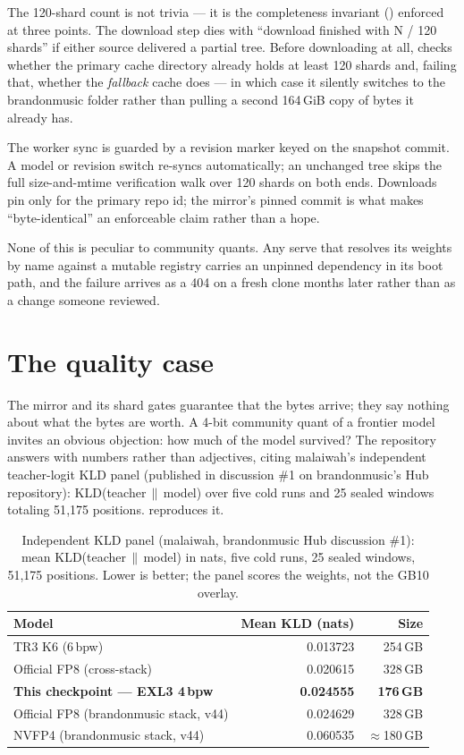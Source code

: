 The 120-shard count is not trivia --- it is the completeness invariant
() enforced at three points. The download step
dies with ``download finished with N / 120 shards'' if either source
delivered a partial tree. Before downloading at all,
 checks whether the primary cache directory
already holds at least 120 shards and, failing that, whether the
\emph{fallback} cache does --- in which case it silently switches
 to the brandonmusic folder rather than pulling a second
164\,GiB copy of bytes it already has.

The worker sync is guarded by a revision marker keyed on the snapshot
commit. A model or revision switch re-syncs automatically; an unchanged tree
skips the full size-and-mtime verification walk over 120 shards on both
ends. Downloads pin
 only for the primary repo id; the mirror's pinned commit is
what makes ``byte-identical'' an enforceable claim rather than a hope.

None of this is peculiar to community quants. Any serve that resolves its
weights by name against a mutable registry carries an unpinned dependency in
its boot path, and the failure arrives as a 404 on a fresh clone months
later rather than as a change someone reviewed.

\section{The quality case}
\label{sec:qbet-quality}

The mirror and its shard gates guarantee that the bytes arrive; they say
nothing about what the bytes are worth. A 4-bit community quant of a
frontier model invites an obvious objection:
how much of the model survived? The repository answers with numbers rather than
adjectives, citing malaiwah's independent teacher-logit KLD panel (published
in discussion \#1 on brandonmusic's Hub repository): KLD(teacher\,$\|$\,model)
over five cold runs and 25 sealed windows totaling 51{,}175 positions.
 reproduces it.

\begin{table}[htbp]
\centering\small
\caption{Independent KLD panel (malaiwah, brandonmusic Hub discussion \#1):
mean KLD(teacher\,$\|$\,model) in nats, five cold runs, 25 sealed windows,
51{,}175 positions. Lower is better; the panel scores the weights, not the
GB10 overlay.}
\label{tab:qbet-kld}
\begin{tabular}{lrr}
\toprule
Model & Mean KLD (nats) & Size \\
\midrule
TR3 K6 (6\,bpw) & 0.013723 & 254\,GB \\
Official FP8 (cross-stack) & 0.020615 & 328\,GB \\
\textbf{This checkpoint --- EXL3 4\,bpw} & \textbf{0.024555} & \textbf{176\,GB} \\
Official FP8 (brandonmusic stack, v44) & 0.024629 & 328\,GB \\
NVFP4 (brandonmusic stack, v44) & 0.060535 & $\approx$180\,GB \\
\bottomrule
\end{tabular}
\end{table}


